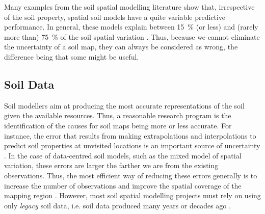 Many examples from the soil spatial modelling literature show that, irrespective of the soil property, spatial 
soil models have a quite variable predictive performance. In general, these models explain between 
\SI{15}{\percent} (or less) and (rarely more than) \SI{75}{\percent} of the soil spatial variation 
\cite{MooreEtAl1993, OdehEtAl1994, GesslerEtAl1995, McKenzieEtAl1999, GobinEtAl2001, SumflethEtAl2008, 
SunEtAl2012, ViscarraRosselEtAl2013, NussbaumEtAl2014, HenglEtAl2015, GaschEtAl2015, HeungEtAl2016}. Thus, 
because we cannot eliminate the uncertainty of a soil map, they can always be considered as wrong, the 
difference being that some might be useful.

\subsection{Soil Data}
\label{sec:chap02-soil-data}

Soil modellers aim at producing the most accurate representations of the soil given the available resources. 
Thus, a reasonable research program is the identification of the causes for soil maps being more or less 
accurate. For instance, the error that results from making extrapolations and interpolations to predict soil 
properties at unvisited locations is an important source of uncertainty \cite{HeuvelinkEtAl1999, 
RefsgaardEtAl2006}. In the case of data-centred soil models, such as the mixed model of spatial variation, 
these errors are larger the farther we are from the existing observations. Thus, the most efficient way of 
reducing these errors generally is to increase the number of observations and improve the spatial coverage of 
the mapping region \cite{BrusEtAl2007a}. However, most soil spatial modelling projects must rely on using only 
\emph{legacy} soil data, i.e. soil data produced many years or decades ago \cite{KempenEtAl2009, HenglEtAl2014,
PoggioEtAl2014, NussbaumEtAl2014, MulderEtAl2016}.

